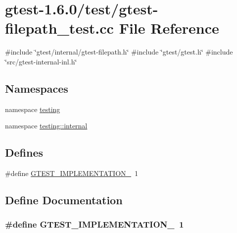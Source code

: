 \hypertarget{gtest-filepath__test_8cc}{\section{gtest-\/1.6.0/test/gtest-\/filepath\-\_\-test.cc \-File \-Reference}
\label{dc/d76/gtest-filepath__test_8cc}
}
{\ttfamily \#include \char`\"{}gtest/internal/gtest-\/filepath.\-h\char`\"{}}\*
{\ttfamily \#include \char`\"{}gtest/gtest.\-h\char`\"{}}\*
{\ttfamily \#include \char`\"{}src/gtest-\/internal-\/inl.\-h\char`\"{}}\*
\subsection*{\-Namespaces}
\begin{DoxyCompactItemize}
\item 
namespace \hyperlink{namespacetesting}{testing}
\item 
namespace \hyperlink{namespacetesting_1_1internal}{testing\-::internal}
\end{DoxyCompactItemize}
\subsection*{\-Defines}
\begin{DoxyCompactItemize}
\item 
\#define \hyperlink{gtest-filepath__test_8cc_a83bd232fd1077579fada92c31bb7469f}{\-G\-T\-E\-S\-T\-\_\-\-I\-M\-P\-L\-E\-M\-E\-N\-T\-A\-T\-I\-O\-N\-\_\-}~1
\end{DoxyCompactItemize}


\subsection{\-Define \-Documentation}
\hypertarget{gtest-filepath__test_8cc_a83bd232fd1077579fada92c31bb7469f}{
\subsubsection[{\-G\-T\-E\-S\-T\-\_\-\-I\-M\-P\-L\-E\-M\-E\-N\-T\-A\-T\-I\-O\-N\-\_\-}]{\setlength{\rightskip}{0pt plus 5cm}\#define {\bf \-G\-T\-E\-S\-T\-\_\-\-I\-M\-P\-L\-E\-M\-E\-N\-T\-A\-T\-I\-O\-N\-\_\-}~1}}\label{dc/d76/gtest-filepath__test_8cc_a83bd232fd1077579fada92c31bb7469f}


